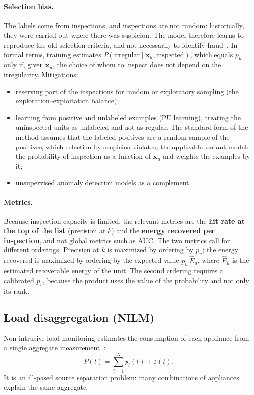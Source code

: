 \documentclass[10pt,a4paper,oneside]{article}
\begin{document}
\paragraph{Selection bias.} The labels come from inspections, and
inspections are not random: historically, they were carried out where there
was suspicion. The model therefore learns to reproduce the old selection
criteria, and not necessarily to identify fraud~\cite{ntlreview}. In formal
terms, training estimates
$P(\text{irregular} \mid \mathbf{x}_u, \text{inspected})$, which equals $p_u$
only if, given $\mathbf{x}_u$, the choice of whom to inspect does not depend
on the irregularity. Mitigations:
\begin{itemize}
  \item reserving part of the inspections for random or exploratory sampling
    (the exploration--exploitation balance);
  \item learning from positive and unlabeled examples (PU learning), treating
    the uninspected units as unlabeled and not as regular. The standard form
    of the method assumes that the labeled positives are a random sample of
    the positives, which selection by suspicion violates; the applicable
    variant models the probability of inspection as a function of
    $\mathbf{x}_u$ and weights the examples by it;
  \item unsupervised anomaly detection models as a complement.
\end{itemize}

\paragraph{Metrics.} Because inspection capacity is limited, the relevant
metrics are the \textbf{hit rate at the top of the list} (precision at $k$)
and the \textbf{energy recovered per inspection}, and not global metrics
such as AUC. The two metrics call for different orderings. Precision at $k$
is maximized by ordering by $p_u$; the energy recovered is maximized by
ordering by the expected value $p_u\,\hat{E}_u$, where $\hat{E}_u$ is the
estimated recoverable energy of the unit. The second ordering requires a
calibrated $p_u$, because the product uses the value of the probability and
not only its rank.

\subsection{Load disaggregation (NILM)}

Non-intrusive load monitoring estimates the consumption of each appliance
from a single aggregate measurement~\cite{hart}:
\begin{equation}
  P(t) = \sum_{i=1}^{N} p_i(t) + \varepsilon(t).
\end{equation}
It is an ill-posed source separation problem: many combinations of
appliances explain the same aggregate.
\end{document}
